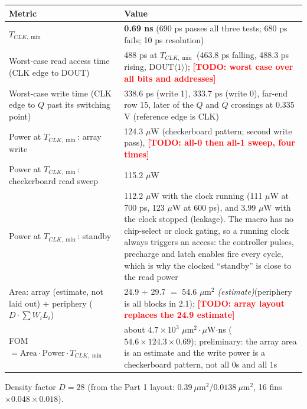 \documentclass[10pt,letterpaper]{article}
\newcommand{\todo}[1]{\textcolor{red}{\textbf{[TODO: #1]}}}
\newcommand{\est}{\textit{(estimate)}}
\begin{document}
\begin{tabularx}{\linewidth}{@{}p{.4\linewidth}X@{}}\toprule Metric & Value\\\midrule
$T_{CLK,\min}$ & \textbf{0.69 ns} (690 ps passes all three tests; 680 ps fails; 10 ps resolution)\\
Worst-case read access time (CLK edge to DOUT) & 488 ps at $T_{CLK,\min}$ (463.8 ps falling, 488.3 ps rising, DOUT$\langle1\rangle$); \todo{worst case over all bits and addresses}\\
Worst-case write time (CLK edge to $Q$ past its switching point) & 338.6 ps (write 1), 333.7 ps (write 0), far-end row 15, later of the $Q$ and $\overline Q$ crossings at 0.335 V (reference edge is CLK)\\
Power at $T_{CLK,\min}$: array write & 124.3 $\mu$W (checkerboard pattern; second write pass), \todo{all-0 then all-1 sweep, four times}\\
Power at $T_{CLK,\min}$: checkerboard read sweep & 115.2 $\mu$W\\
Power at $T_{CLK,\min}$: standby & 112.2 $\mu$W with the clock running (111 $\mu$W at 700 ps, 123 $\mu$W at 600 ps), and 3.99 $\mu$W with the clock stopped (leakage). The macro has no chip-select or clock gating, so a running clock always triggers an access: the controller pulses, precharge and latch enables fire every cycle, which is why the clocked ``standby'' is close to the read power\\
Area: array (estimate, not laid out) $+$ periphery ($D\cdot\sum W_iL_i$) & 24.9 $+$ 29.7 $=$ 54.6 $\mu$m$^2$ \est (periphery is all blocks in 2.1); \todo{array layout replaces the 24.9 estimate}\\
FOM $=\text{Area}\cdot\text{Power}\cdot T_{CLK,\min}$ & about $4.7\times10^3$ $\mu$m$^2\cdot\mu$W$\cdot$ns ($54.6\times124.3\times0.69$); preliminary: the array area is an estimate and the write power is a checkerboard pattern, not all 0s and all 1s\\\bottomrule\end{tabularx}
Density factor $D=28$ (from the Part 1 layout: $0.39\ \mu\text{m}^2/0.0138\ \mu\text{m}^2$, 16 fins $\times0.048\times0.018$).
\end{document}
